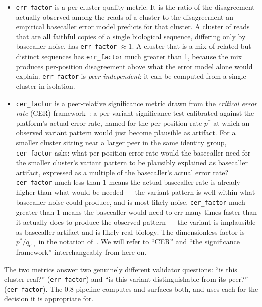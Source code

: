 \documentclass[11pt]{article}
\begin{document}
\begin{itemize}
  \item \texttt{err\_factor} is a per-cluster quality metric. It is the ratio
  of the disagreement actually observed among the reads of a cluster to the
  disagreement an empirical basecaller error model predicts for that cluster.
  A cluster of reads that are all faithful copies of a single biological
  sequence, differing only by basecaller noise, has \texttt{err\_factor}
  $\approx 1$. A cluster that is a mix of related-but-distinct sequences has
  \texttt{err\_factor} much greater than 1, because the mix produces
  per-position disagreement above what the error model alone would explain.
  \texttt{err\_factor} is \emph{peer-independent}: it can be computed from a
  single cluster in isolation.

  \item \texttt{cer\_factor} is a peer-relative significance metric drawn
  from the \emph{critical error rate} (CER) framework~\cite{cer_paper,cer_in_practice}:
  a per-variant significance test calibrated against the platform's
  actual error rate, named for the per-position rate
  $p^\ast$ at which an observed variant pattern would just become
  plausible as artifact. For a smaller cluster sitting near a larger
  peer in the same identity group, \texttt{cer\_factor} asks: what
  per-position error rate would the basecaller need for the smaller
  cluster's variant pattern to be plausibly explained as basecaller
  artifact, expressed as a multiple of the basecaller's actual error
  rate? \texttt{cer\_factor} much less than 1 means the actual basecaller
  rate is already higher than what would be needed --- the variant
  pattern is well within what basecaller noise could produce, and is
  most likely noise. \texttt{cer\_factor} much greater than 1 means the
  basecaller would need to err many times faster than it actually does
  to produce the observed pattern --- the variant is implausible as
  basecaller artifact and is likely real biology. The dimensionless
  factor is $p^\ast/q_\text{ctx}$ in the notation of~\cite{cer_in_practice}.
  We will refer to ``CER'' and ``the significance framework''
  interchangeably from here on.
\end{itemize}

The two metrics answer two genuinely different validator questions: ``is this
cluster real?'' (\texttt{err\_factor}) and ``is this variant distinguishable
from its peer?'' (\texttt{cer\_factor}). The 0.8 pipeline computes and surfaces
both, and uses each for the decision it is appropriate for.
\end{document}
